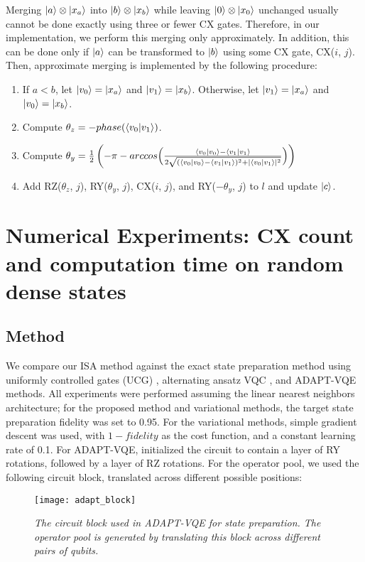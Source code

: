 \documentclass{article}
\begin{document}
Merging $\mathinner{|{a}\rangle} \otimes \mathinner{|{x_a}\rangle}$ into $\mathinner{|{b}\rangle} \otimes \mathinner{|{x_b}\rangle}$
while leaving $\mathinner{|{0}\rangle} \otimes \mathinner{|{x_0}\rangle}$ unchanged usually cannot be done 
exactly using three or fewer CX gates. Therefore, in our implementation, we
perform this merging only approximately. In addition, this can be done only
if $\mathinner{|{a}\rangle}$ can be transformed to $\mathinner{|{b}\rangle}$ using some CX gate, CX($i$, $j$).
Then, approximate merging is implemented by the following procedure:
\begin{enumerate}
    \item If $a < b$, let $\mathinner{|{v_0}\rangle} = \mathinner{|{x_a}\rangle}$ and $\mathinner{|{v_1}\rangle} = \mathinner{|{x_b}\rangle}$.
    Otherwise, let $\mathinner{|{v_1}\rangle} = \mathinner{|{x_a}\rangle}$ and $\mathinner{|{v_0}\rangle} = \mathinner{|{x_b}\rangle}$.
    \item Compute $\theta_z = -phase(\mathinner{\langle{v_0|v_1}\rangle})$.
    \item Compute $\theta_y = \frac{1}{2}\left(-\pi - arccos\Bigl(\frac{\mathinner{\langle{v_0 | v_0}\rangle}
      - \mathinner{\langle{v_1 | v_1}\rangle}}{2\sqrt{(\mathinner{\langle{v_0 | v_0}\rangle} - \mathinner{\langle{v_1 | v_1}\rangle})^2
      + |\mathinner{\langle{v_0 | v_1}\rangle}|^2}}\Bigr)\right)$
    \item Add RZ($\theta_z$, $j$), RY($\theta_y$, $j$), CX($i$, $j$), and
      RY($-\theta_y$, $j$) to $l$ and update $\mathinner{|{c}\rangle}$.
\end{enumerate}

\section{Numerical Experiments: CX count and computation time on random dense states}
\subsection{Method}
We compare our ISA method against the exact state preparation method using
uniformly controlled gates (UCG) \cite{bergholm2005quantum}, alternating ansatz
VQC \cite{zhang2020toward}, and ADAPT-VQE \cite{grimsley2019adaptive} methods.
All
experiments were performed assuming the linear nearest neighbors architecture;
for the proposed method and variational methods, the target state preparation
fidelity was set to 0.95. For the variational methods, simple gradient descent
was used, with $1 - fidelity$ as the cost function, and a constant learning
rate of 0.1. For ADAPT-VQE, initialized the circuit to contain a layer of RY
rotations, followed by a layer of RZ rotations. For the operator pool, we used 
the following circuit block, translated across different possible positions:

\begin{figure}[H]
\centering
\texttt{[image: adapt\_block]}
\caption{\textit{The circuit block used in ADAPT-VQE for state preparation. The operator
pool is generated by translating this block across different pairs of qubits.}}
\end{figure}
\end{document}
